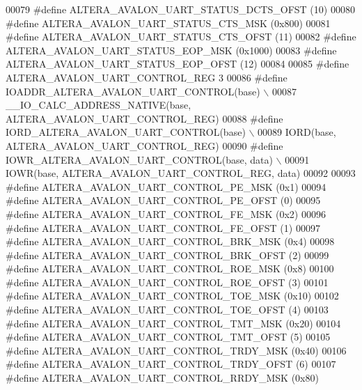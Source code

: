 \begin{DoxyCode}
00079 \textcolor{preprocessor}{#define ALTERA\_AVALON\_UART\_STATUS\_DCTS\_OFST           (10)}
00080 \textcolor{preprocessor}{#define ALTERA\_AVALON\_UART\_STATUS\_CTS\_MSK             (0x800)}
00081 \textcolor{preprocessor}{#define ALTERA\_AVALON\_UART\_STATUS\_CTS\_OFST            (11)}
00082 \textcolor{preprocessor}{#define ALTERA\_AVALON\_UART\_STATUS\_EOP\_MSK             (0x1000)}
00083 \textcolor{preprocessor}{#define ALTERA\_AVALON\_UART\_STATUS\_EOP\_OFST            (12)}
00084 
00085 \textcolor{preprocessor}{#define ALTERA\_AVALON\_UART\_CONTROL\_REG                3}
00086 \textcolor{preprocessor}{#define IOADDR\_ALTERA\_AVALON\_UART\_CONTROL(base)       \(\backslash\)}
00087 \textcolor{preprocessor}{        \_\_IO\_CALC\_ADDRESS\_NATIVE(base, ALTERA\_AVALON\_UART\_CONTROL\_REG)}
00088 \textcolor{preprocessor}{#define IORD\_ALTERA\_AVALON\_UART\_CONTROL(base)         \(\backslash\)}
00089 \textcolor{preprocessor}{        IORD(base, ALTERA\_AVALON\_UART\_CONTROL\_REG)}
00090 \textcolor{preprocessor}{#define IOWR\_ALTERA\_AVALON\_UART\_CONTROL(base, data)   \(\backslash\)}
00091 \textcolor{preprocessor}{        IOWR(base, ALTERA\_AVALON\_UART\_CONTROL\_REG, data)}
00092 
00093 \textcolor{preprocessor}{#define ALTERA\_AVALON\_UART\_CONTROL\_PE\_MSK             (0x1)}
00094 \textcolor{preprocessor}{#define ALTERA\_AVALON\_UART\_CONTROL\_PE\_OFST            (0)}
00095 \textcolor{preprocessor}{#define ALTERA\_AVALON\_UART\_CONTROL\_FE\_MSK             (0x2)}
00096 \textcolor{preprocessor}{#define ALTERA\_AVALON\_UART\_CONTROL\_FE\_OFST            (1)}
00097 \textcolor{preprocessor}{#define ALTERA\_AVALON\_UART\_CONTROL\_BRK\_MSK            (0x4)}
00098 \textcolor{preprocessor}{#define ALTERA\_AVALON\_UART\_CONTROL\_BRK\_OFST           (2)}
00099 \textcolor{preprocessor}{#define ALTERA\_AVALON\_UART\_CONTROL\_ROE\_MSK            (0x8)}
00100 \textcolor{preprocessor}{#define ALTERA\_AVALON\_UART\_CONTROL\_ROE\_OFST           (3)}
00101 \textcolor{preprocessor}{#define ALTERA\_AVALON\_UART\_CONTROL\_TOE\_MSK            (0x10)}
00102 \textcolor{preprocessor}{#define ALTERA\_AVALON\_UART\_CONTROL\_TOE\_OFST           (4)}
00103 \textcolor{preprocessor}{#define ALTERA\_AVALON\_UART\_CONTROL\_TMT\_MSK            (0x20)}
00104 \textcolor{preprocessor}{#define ALTERA\_AVALON\_UART\_CONTROL\_TMT\_OFST           (5)}
00105 \textcolor{preprocessor}{#define ALTERA\_AVALON\_UART\_CONTROL\_TRDY\_MSK           (0x40)}
00106 \textcolor{preprocessor}{#define ALTERA\_AVALON\_UART\_CONTROL\_TRDY\_OFST          (6)}
00107 \textcolor{preprocessor}{#define ALTERA\_AVALON\_UART\_CONTROL\_RRDY\_MSK           (0x80)}

\end{DoxyCode}
